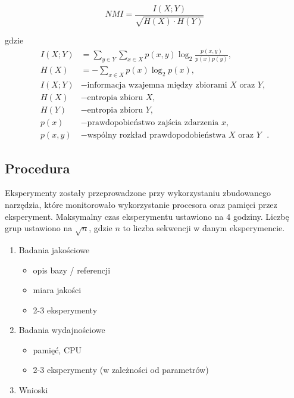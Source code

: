             \begin{equation}
                NMI = \frac{I(X; Y)}{\sqrt{H(X) \cdot H(Y)}}
            \end{equation}

            gdzie 
            \begin{align*}
                I(X; Y) &= \sum_{y \in Y}{ \sum_{x \in X}{p(x, y) \log_{2}{\frac{p(x, y)}{p(x) p(y)}}}}, \\
                H(X) &= - \sum_{x \in X}{ p(x) \log_{2}{p(x)}}, \\
                I(X; Y) &- \text{informacja wzajemna między zbiorami $X$ oraz $Y$}, \\
                H(X) &- \text{entropia zbioru $X$}, \\
                H(Y) &- \text{entropia zbioru $Y$}, \\
                p(x) &- \text{prawdopobieństwo zajścia zdarzenia $x$}, \\
                p(x, y) &- \text{wspólny rozkład prawdopodobieństwa $X$ oraz $Y$ }.
            \end{align*}

        \subsection{Procedura}


           Eksperymenty zostały przeprowadzone przy wykorzystaniu zbudowanego narzędzia, które monitorowało wykorzystanie procesora oraz pamięci przez eksperyment. Maksymalny czas eksperymentu ustawiono na 4 godziny. Liczbę grup ustawiono na $\sqrt{n}$, gdzie $n$ to liczba sekwencji w danym eksperymencie.

\begin{enumerate}
    \item Badania jakościowe
    \begin{itemize}
        \item opis bazy / referencji
        \item miara jakości
        \item 2-3 eksperymenty
    \end{itemize}
    \item Badania wydajnościowe
    \begin{itemize}
        \item pamięć, CPU
        \item 2-3 eksperymenty  (w zależności od parametrów)
    \end{itemize}
    \item Wnioski
\end{enumerate}